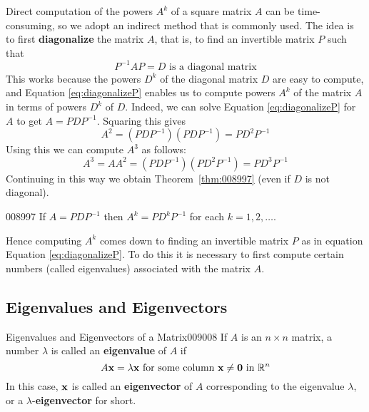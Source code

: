 Direct computation of the powers $A^{k}$ of a square matrix $A$ can be time-consuming, so we adopt an indirect method that is commonly used. The idea is to first \textbf{diagonalize} the matrix $A$, that is, to find an invertible matrix $P$ such that
\begin{equation}\label{eq:diagonalizeP}
P^{-1}AP=D \mbox{ is a diagonal matrix}
\end{equation}
This works because the powers $D^{k}$ of the diagonal matrix $D$ are easy to compute, and Equation \ref{eq:diagonalizeP} enables us to compute powers $A^{k}$ of the matrix $A$ in terms of powers $D^{k}$ of $D$. Indeed, we can solve Equation \ref{eq:diagonalizeP} for $A$ to get $A = PDP^{-1}$. Squaring this gives
\begin{equation*}
A^2 = (PDP^{-1})(PDP^{-1}) = PD^2P^{-1}
\end{equation*}
Using this we can compute $A^{3}$ as follows:
\begin{equation*}
A^3 = AA^2 = (PDP^{-1})(PD^2P^{-1}) = PD^3P^{-1}
\end{equation*}
Continuing in this way we obtain Theorem~\ref{thm:008997} (even if $D$ is not diagonal).


\begin{theorem}{}{008997}
If $A = PDP^{-1}$ then $A^{k} = PD^{k}P^{-1}$ for each $k = 1, 2, \dots$.
\end{theorem}

Hence computing $A^{k}$ comes down to finding an invertible matrix $P$ as in equation Equation \ref{eq:diagonalizeP}. To do this it is necessary to first compute certain numbers (called eigenvalues) associated with the matrix $A$.


\subsection*{Eigenvalues and Eigenvectors}

\begin{definition}{Eigenvalues and Eigenvectors of a Matrix}{009008}
If $A$ is an $n \times n$ matrix, a number $\lambda$ is called an \textbf{eigenvalue} of $A$ if
\begin{equation*}
A\textbf{x} = \lambda \textbf{x} \mbox{ for some column } \textbf{x} \neq \textbf{0} \mbox{ in } \mathbb{R}^n
\end{equation*}
In this case, $\textbf{x}$ is called an \textbf{eigenvector} of $A$ corresponding to the eigenvalue $\lambda$, or a $\lambda$-\textbf{eigenvector} for short.
\end{definition}


